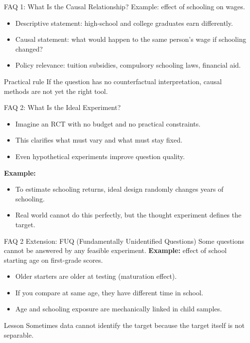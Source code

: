\documentclass[11pt,aspectratio=169]{beamer}
\newcommand{\derivbutton}[1]{\vspace{0.4em}\hfill\hyperlink{app:#1}{\beamerbutton{Appendix details}}}
\begin{document}
\begin{frame}{FAQ 1: What Is the Causal Relationship?}
  Example: effect of schooling on wages.
  \begin{itemize}
    \item Descriptive statement: high-school and college graduates earn differently.
    \item Causal statement: what would happen to the same person's wage if schooling changed?
    \item Policy relevance: tuition subsidies, compulsory schooling laws, financial aid.
  \end{itemize}
  \begin{block}{Practical rule}
    If the question has no counterfactual interpretation, causal methods are not yet the right tool.
  \end{block}
\end{frame}

\begin{frame}{FAQ 2: What Is the Ideal Experiment?}
  \begin{itemize}
    \item Imagine an RCT with no budget and no practical constraints.
    \item This clarifies what must vary and what must stay fixed.
    \item Even hypothetical experiments improve question quality.
  \end{itemize}
  \textbf{Example:}
  \begin{itemize}
    \item To estimate schooling returns, ideal design randomly changes years of schooling.
    \item Real world cannot do this perfectly, but the thought experiment defines the target.
  \end{itemize}
\end{frame}

\begin{frame}{FAQ 2 Extension: FUQ (Fundamentally Unidentified Questions)}
  \hypertarget{main:fuq}{}
  Some questions cannot be answered by any feasible experiment.
  \vspace{0.3em}
  \textbf{Example:}
  effect of school starting age on first-grade scores.
  \begin{itemize}
    \item Older starters are older at testing (maturation effect).
    \item If you compare at same age, they have different time in school.
    \item Age and schooling exposure are mechanically linked in child samples.
  \end{itemize}
  \begin{block}{Lesson}
    Sometimes data cannot identify the target because the target itself is not separable.
  \end{block}
  \derivbutton{fuq-algebra}
\end{frame}
\end{document}

